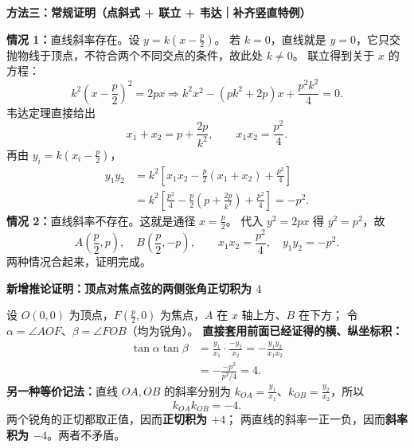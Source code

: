 \clearpage
\begin{proofbox}
\textbf{\textcolor{CProof}{方法三：常规证明（点斜式 + 联立 + 韦达｜补齐竖直特例）}}\par\smallskip
\begin{center}\end{center}
\textbf{情况 1：}直线斜率存在。设 $y=k(x-\frac p2)$。
若 $k=0$，直线就是 $y=0$，它只交抛物线于顶点，不符合两个不同交点的条件，故此处 $k\ne0$。
联立得到关于 $x$ 的方程：
\[
 k^2\left(x-\frac p2\right)^2=2px
 \Longrightarrow
 k^2x^2-(pk^2+2p)x+\frac{p^2k^2}{4}=0.
\]
韦达定理直接给出
\[
 x_1+x_2=p+\frac{2p}{k^2},\qquad
 \boxed{x_1x_2=\frac{p^2}{4}}.
\]
再由 $y_i=k(x_i-\frac p2)$，
\[
 \begin{aligned}
 y_1y_2&=k^2\left[x_1x_2-\frac p2(x_1+x_2)+\frac{p^2}{4}\right]\\
 &=k^2\left[\frac{p^2}{4}-\frac p2\left(p+\frac{2p}{k^2}\right)+\frac{p^2}{4}\right]
 =\boxed{-p^2}.
 \end{aligned}
\]
\textbf{情况 2：}直线斜率不存在。这就是通径 $x=\frac p2$。
代入 $y^2=2px$ 得 $y^2=p^2$，故
\[
 A\!\left(\frac p2,p\right),\quad
 B\!\left(\frac p2,-p\right),\qquad
 x_1x_2=\frac{p^2}{4},\quad y_1y_2=-p^2.
\]
两种情况合起来，证明完成。
\end{proofbox}
\clearpage
\begin{proofbox}
\textbf{\textcolor{CProof}{新增推论证明：顶点对焦点弦的两侧张角正切积为 $4$}}
\begin{center}\end{center}

设 $O(0,0)$ 为顶点，$F(\frac p2,0)$ 为焦点，$A$ 在 $x$ 轴上方、$B$ 在下方；
令 $\alpha=\angle AOF$、$\beta=\angle FOB$（均为锐角）。
\textbf{直接套用前面已经证得的横、纵坐标积：}
\[
 \begin{aligned}
 \tan\alpha\tan\beta
 &=\frac{y_1}{x_1}\cdot\frac{-y_2}{x_2}
 =-\frac{y_1y_2}{x_1x_2}\\[3pt]
 &=-\frac{-p^2}{p^2/4}=\boxed{4}.
 \end{aligned}
\]
\textbf{另一种等价记法：}直线 $OA,OB$ 的斜率分别为
$k_{OA}=\frac{y_1}{x_1}$、$k_{OB}=\frac{y_2}{x_2}$，所以
\[
 \boxed{k_{OA}k_{OB}=-4}.
\]
两个锐角的正切都取正值，因而\textbf{正切积为 $+4$}；
两直线的斜率一正一负，因而\textbf{斜率积为 $-4$}。两者不矛盾。
\end{proofbox}
\clearpage
